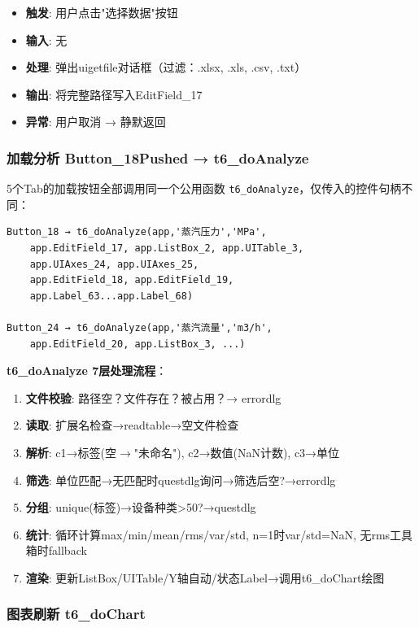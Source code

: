 \documentclass[12pt,a3paper]{ctexart}
\begin{document}
\begin{itemize}
    \item \textbf{触发}: 用户点击"选择数据"按钮
    \item \textbf{输入}: 无
    \item \textbf{处理}: 弹出uigetfile对话框（过滤：.xlsx, .xls, .csv, .txt）
    \item \textbf{输出}: 将完整路径写入EditField\_17
    \item \textbf{异常}: 用户取消 → 静默返回
\end{itemize}

\subsubsection{加载分析 Button\_18Pushed → t6\_doAnalyze}

5个Tab的加载按钮全部调用同一个公用函数 \texttt{t6\_doAnalyze}，仅传入的控件句柄不同：

\begin{verbatim}
Button_18 → t6_doAnalyze(app,'蒸汽压力','MPa',
    app.EditField_17, app.ListBox_2, app.UITable_3,
    app.UIAxes_24, app.UIAxes_25,
    app.EditField_18, app.EditField_19,
    app.Label_63...app.Label_68)

Button_24 → t6_doAnalyze(app,'蒸汽流量','m3/h',
    app.EditField_20, app.ListBox_3, ...)
\end{verbatim}

\textbf{t6\_doAnalyze 7层处理流程}：

\begin{enumerate}[label=\textbf{L\arabic*:}, leftmargin=*]
    \item \textbf{文件校验}: 路径空？文件存在？被占用？→ errordlg
    \item \textbf{读取}: 扩展名检查→readtable→空文件检查
    \item \textbf{解析}: c1→标签(空$\to$"未命名"), c2→数值(NaN计数), c3→单位
    \item \textbf{筛选}: 单位匹配→无匹配时questdlg询问→筛选后空?→errordlg
    \item \textbf{分组}: unique(标签)→设备种类>50?→questdlg
    \item \textbf{统计}: 循环计算max/min/mean/rms/var/std, n=1时var/std=NaN, 无rms工具箱时fallback
    \item \textbf{渲染}: 更新ListBox/UITable/Y轴自动/状态Label→调用t6\_doChart绘图
\end{enumerate}

\subsubsection{图表刷新 t6\_doChart}
\end{document}
